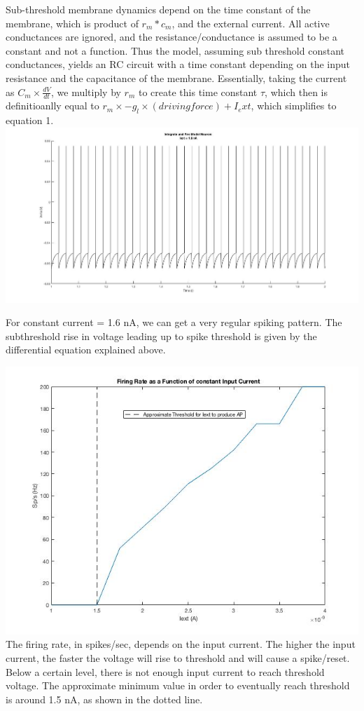 \documentclass{121Temp}
\begin{document}
\maketitle

\hwproblem
\label{Q1}
Sub-threshold membrane dynamics depend on the time constant of the membrane, which is product of $r_m*c_m$, and the external current. All active conductances are ignored, and the resistance/conductance is assumed to be a constant and not a function. Thus the model, assuming sub threshold constant conductances, yields an RC circuit with a time constant depending on the input resistance and the capacitance of the membrane. Essentially, taking the current as $C_m \times \frac{dV}{dt}$, we multiply by $r_m$ to create this time constant $\tau$, which then is definitioanlly equal to $r_m \times -g_l \times (driving force) + I_ext$, which simplifies to equation 1.
\hwproblem
\includegraphics[scale=.45]{one.jpg}

For constant current = 1.6 nA, we can get a very regular spiking pattern. The subthreshold rise in voltage leading up to spike threshold is given by the differential equation explained above.

\hwproblem
\includegraphics[scale=.75]{two.jpg}
The firing rate, in spikes/sec, depends on the input current. The higher the input current, the faster the voltage will rise to threshold and will cause a spike/reset. Below a certain level, there is not enough input current to reach threshold voltage. The approximate minimum value in order to eventually reach threshold is around 1.5 nA, as shown in the dotted line. 
\end{document}
